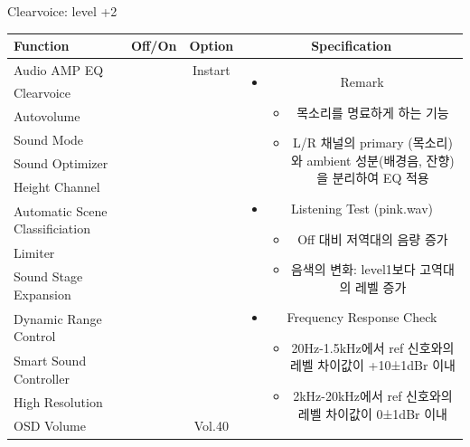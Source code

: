 \documentclass{beamer}
\begin{document}
\begin{frame}[t]{Clearvoice: level +2}
\begin{tiny}
\begin{tabular}{@{}lccc@{}}
\toprule
Function & Off/On & Option & Specification \\
\midrule
Audio AMP EQ & \color{black}{Off} & Instart &
\multirow{13}{60mm}{
\begin{itemize}
\item Remark
	\begin{itemize}
	\item 목소리를 명료하게 하는 기능
	\item L/R 채널의 primary (목소리)와 ambient 성분(배경음, 잔향)을 분리하여 EQ 적용
	\end{itemize}
\item Listening Test (pink.wav)
	\begin{itemize}
	\item Off 대비 저역대의 음량 증가
	\item 음색의 변화: level1보다 고역대의 레벨 증가
	\end{itemize}
\item Frequency Response Check
  \begin{itemize}
  \item 20Hz-1.5kHz에서 ref 신호와의 레벨 차이값이 +10±1dBr 이내
  \item 2kHz-20kHz에서 ref 신호와의 레벨 차이값이 0±1dBr 이내
  \end{itemize}
\end{itemize}
} \\
Clearvoice & \color{blue}{On} & \color{blue}{+2} & \\
Autovolume & \color{black}{Off} & & \\
Sound Mode & \color{black}{Off} & & \\
Sound Optimizer & \color{black}{Off} & & \\
Height Channel & \color{black}{Off} & & \\
Automatic Scene Classificiation & \color{black}{Off} & & \\
Limiter & \color{black}{Off} & & \\
Sound Stage Expansion & \color{black}{Off} & & \\
Dynamic Range Control & \color{black}{Off} & & \\
Smart Sound Controller & \color{black}{Off} & & \\
High Resolution & \color{black}{Off} & & \\
OSD Volume & \color{blue}{On} & Vol.40 & \\
\midrule
\end{tabular}
\end{tiny}


\end{frame}
\end{document}
